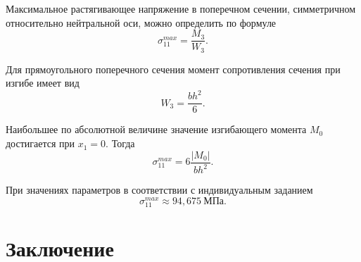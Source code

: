 \documentclass[12pt, a4paper]{article}
\begin{document}
Максимальное растягивающее напряжение в поперечном сечении, симметричном относительно нейтральной оси, можно определить по формуле
\[
\sigma_{11}^{max} = \frac{M_3}{W_3}.
\]

Для прямоугольного поперечного сечения момент сопротивления сечения при изгибе имеет вид
\[
W_3 = \frac{b h^2}{6}.
\]

Наибольшее по абсолютной величине значение изгибающего момента $M_0$ достигается при $x_1 = 0$. Тогда 
\[
\sigma_{11}^{max} = 6 \frac{|M_0|}{b h^2}.
\]

При значениях параметров в соответствии с индивидуальным заданием
\[
\sigma_{11}^{max} \approx 94{,}675 \ \text{МПа}.
\]

\newpage
\section{Заключение}
\end{document}
